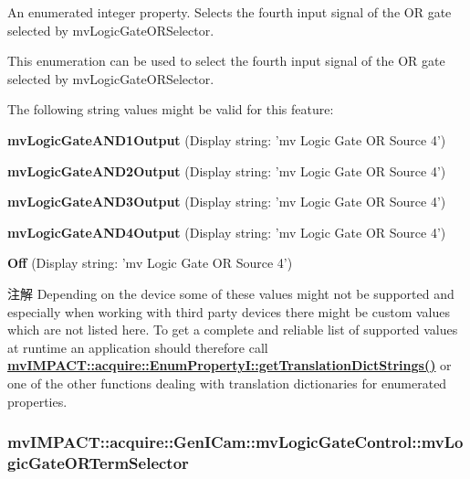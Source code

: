 An enumerated integer property. Selects the fourth input signal of the O\+R gate selected by mv\+Logic\+Gate\+O\+R\+Selector. 

This enumeration can be used to select the fourth input signal of the O\+R gate selected by mv\+Logic\+Gate\+O\+R\+Selector.

The following string values might be valid for this feature\+:
\begin{DoxyItemize}
\item {\bfseries mv\+Logic\+Gate\+A\+N\+D1\+Output} (Display string\+: 'mv Logic Gate O\+R Source 4')
\item {\bfseries mv\+Logic\+Gate\+A\+N\+D2\+Output} (Display string\+: 'mv Logic Gate O\+R Source 4')
\item {\bfseries mv\+Logic\+Gate\+A\+N\+D3\+Output} (Display string\+: 'mv Logic Gate O\+R Source 4')
\item {\bfseries mv\+Logic\+Gate\+A\+N\+D4\+Output} (Display string\+: 'mv Logic Gate O\+R Source 4')
\item {\bfseries Off} (Display string\+: 'mv Logic Gate O\+R Source 4')
\end{DoxyItemize}

\begin{DoxyNote}{注解}
Depending on the device some of these values might not be supported and especially when working with third party devices there might be custom values which are not listed here. To get a complete and reliable list of supported values at runtime an application should therefore call {\bfseries \hyperlink{classmv_i_m_p_a_c_t_1_1acquire_1_1_enum_property_i_a0ba6ccbf5ee69784d5d0b537924d26b6}{mv\+I\+M\+P\+A\+C\+T\+::acquire\+::\+Enum\+Property\+I\+::get\+Translation\+Dict\+Strings()}} or one of the other functions dealing with translation dictionaries for enumerated properties. 
\end{DoxyNote}
\hypertarget{classmv_i_m_p_a_c_t_1_1acquire_1_1_gen_i_cam_1_1mv_logic_gate_control_af26ef99b8f2eb5b478ea576e4ebd3c70}{
\subsubsection[{mv\+Logic\+Gate\+O\+R\+Term\+Selector}]{ mv\+I\+M\+P\+A\+C\+T\+::acquire\+::\+Gen\+I\+Cam\+::mv\+Logic\+Gate\+Control\+::mv\+Logic\+Gate\+O\+R\+Term\+Selector}}\label{classmv_i_m_p_a_c_t_1_1acquire_1_1_gen_i_cam_1_1mv_logic_gate_control_af26ef99b8f2eb5b478ea576e4ebd3c70}


